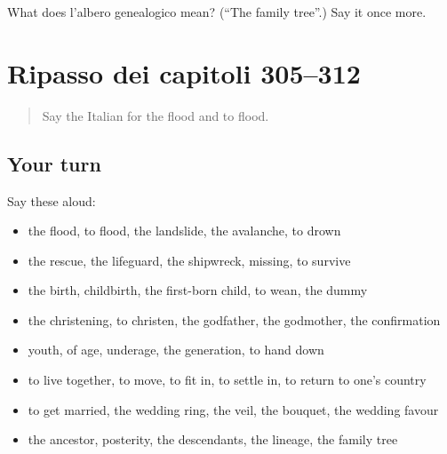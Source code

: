\begin{tcolorbox}[breakable,colback=teal!4,colframe=teal!35!black,title={Before you move on}]
What does l'albero genealogico mean? (\textquotedblleft{}The family tree\textquotedblright{}.) Say it once more.
\end{tcolorbox}
\section[(dialogue)]{Ripasso dei capitoli 305–312}

\label{lesson:IT-R312-ripasso-305-312}



\begin{quote}
Say the Italian for the flood and to flood.
\end{quote}

\subsection*{Your turn}
Say these aloud:

\begin{itemize}
\raggedright
  \item the flood, to flood, the landslide, the avalanche, to drown
  \item the rescue, the lifeguard, the shipwreck, missing, to survive
  \item the birth, childbirth, the first-born child, to wean, the dummy
  \item the christening, to christen, the godfather, the godmother, the confirmation
  \item youth, of age, underage, the generation, to hand down
  \item to live together, to move, to fit in, to settle in, to return to one's country
  \item to get married, the wedding ring, the veil, the bouquet, the wedding favour
  \item the ancestor, posterity, the descendants, the lineage, the family tree
\end{itemize}

